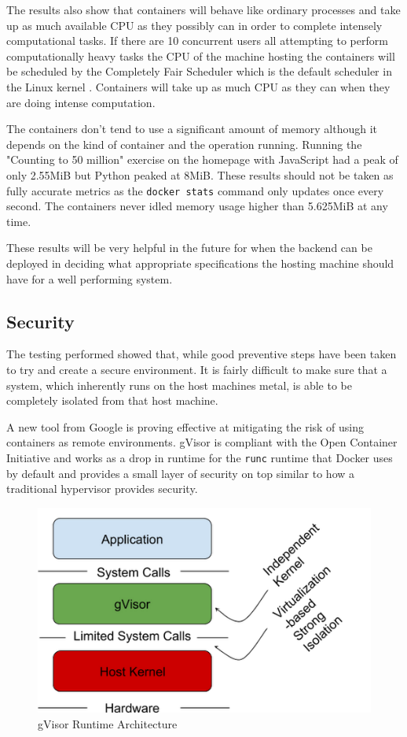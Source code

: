 \documentclass[12pt, a4paper]{extreport}
\begin{document}
The results also show that containers will behave like ordinary processes and take up as much available CPU as they possibly can in order to complete intensely computational tasks. If there are 10 concurrent users all attempting to perform computationally heavy tasks the CPU of the machine hosting the containers will be scheduled by the Completely Fair Scheduler which is the default scheduler in the Linux kernel \cite{cfs-article}.
Containers will take up as much CPU as they can when they are doing intense computation.

The containers don't tend to use a significant amount of memory although it depends on the kind of container and the operation running. Running the "Counting to 50 million" exercise on the homepage with JavaScript had a peak of only 2.55MiB but Python peaked at 8MiB. These results should not be taken as fully accurate metrics as the \texttt{docker stats} command only updates once every second. The containers never idled memory usage higher than 5.625MiB at any time.

These results will be very helpful in the future for when the backend can be deployed in deciding what appropriate specifications the hosting machine should have for a well performing system.

\subsection{Security}

The testing performed showed that, while good preventive steps have been taken to try and create a secure environment. It is fairly difficult to make sure that a system, which inherently runs on the host machines metal, is able to be completely isolated from that host machine.

A new tool from Google is proving effective at mitigating the risk of using containers as remote environments. gVisor \cite{gvisor} is compliant with the Open Container Initiative and works as a drop in runtime for the \texttt{runc} runtime that Docker uses by default and provides a small layer of security on top similar to how a traditional hypervisor provides security.

\begin{figure}[h!]
    \centering
    \includegraphics[scale=0.5]{res/gvisor.PNG}
    \caption{gVisor Runtime Architecture \cite{gvisor-info}}
    \label{fig:gvisor}
\end{figure}
\end{document}
